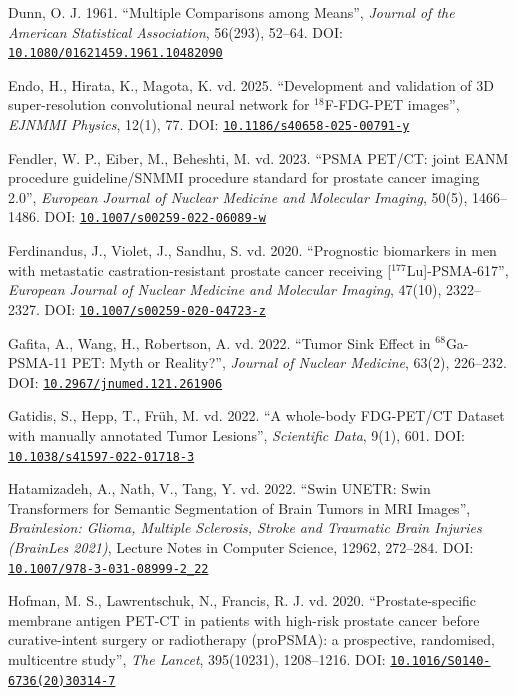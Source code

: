 \documentclass[11pt,a4paper]{article}
\newcommand{\doi}[1]{DOI: \href{https://doi.org/#1}{\nolinkurl{#1}}}
\begin{document}
\begin{list}{}{\setlength{\leftmargin}{1.5em}\setlength{\itemindent}{-1.5em}%
  \setlength{\itemsep}{0.25\baselineskip}\setlength{\parsep}{0pt}}
\item Dunn, O. J. 1961. ``Multiple Comparisons among Means'', \emph{Journal of the American
Statistical Association}, 56(293), 52--64. \doi{10.1080/01621459.1961.10482090}

\item Endo, H., Hirata, K., Magota, K. vd. 2025. ``Development and validation of 3D
super-resolution convolutional neural network for $^{18}$F-FDG-PET images'', \emph{EJNMMI Physics},
12(1), 77. \doi{10.1186/s40658-025-00791-y}

\item Fendler, W. P., Eiber, M., Beheshti, M. vd. 2023. ``PSMA PET/CT: joint EANM procedure
guideline/SNMMI procedure standard for prostate cancer imaging 2.0'', \emph{European Journal of
Nuclear Medicine and Molecular Imaging}, 50(5), 1466--1486. \doi{10.1007/s00259-022-06089-w}

\item Ferdinandus, J., Violet, J., Sandhu, S. vd. 2020. ``Prognostic biomarkers in men with
metastatic castration-resistant prostate cancer receiving [$^{177}$Lu]-PSMA-617'',
\emph{European Journal of Nuclear Medicine and Molecular Imaging}, 47(10), 2322--2327.
\doi{10.1007/s00259-020-04723-z}

\item Gafita, A., Wang, H., Robertson, A. vd. 2022. ``Tumor Sink Effect in $^{68}$Ga-PSMA-11 PET:
Myth or Reality?'', \emph{Journal of Nuclear Medicine}, 63(2), 226--232.
\doi{10.2967/jnumed.121.261906}

\item Gatidis, S., Hepp, T., Früh, M. vd. 2022. ``A whole-body FDG-PET/CT Dataset with manually
annotated Tumor Lesions'', \emph{Scientific Data}, 9(1), 601. \doi{10.1038/s41597-022-01718-3}

\item Hatamizadeh, A., Nath, V., Tang, Y. vd. 2022. ``Swin UNETR: Swin Transformers for Semantic
Segmentation of Brain Tumors in MRI Images'', \emph{Brainlesion: Glioma, Multiple Sclerosis,
Stroke and Traumatic Brain Injuries (BrainLes 2021)}, Lecture Notes in Computer Science, 12962,
272--284. \doi{10.1007/978-3-031-08999-2_22}

\item Hofman, M. S., Lawrentschuk, N., Francis, R. J. vd. 2020. ``Prostate-specific membrane
antigen PET-CT in patients with high-risk prostate cancer before curative-intent surgery or
radiotherapy (proPSMA): a prospective, randomised, multicentre study'', \emph{The Lancet},
395(10231), 1208--1216. \doi{10.1016/S0140-6736(20)30314-7}


\end{list}
\end{document}
